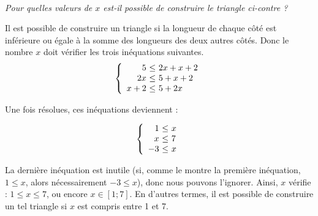 \documentclass[12pt]{article}
\begin{document}
\begin{exercice}~
  \begin{multicols}{2}
    \emph{Pour quelles valeurs de $x$ est-il possible de construire le triangle ci-contre ?}


\end{multicols}
Il est possible de construire un triangle si la longueur de chaque côté est inférieure ou égale à la somme des longueurs des deux autres côtés. Donc le nombre $x$ doit vérifier les trois inéquations suivantes.
\[\left\{\begin{array}{r@{\ \leq\ }l}
    5 & 2x+x+2\\
    2x & 5+x+2\\
    x+2 & 5+2x
\end{array}\right.\]

Une fois résolues, ces inéquations deviennent :

\[\left\{\begin{array}{r@{\ \leq\ }l}
    1 & x\\
    x & 7\\
    -3 & x
\end{array}\right.\]

La dernière inéquation est inutile (si, comme le montre la première inéquation, $1\leq x$, alors nécessairement $-3\leq x$), donc nous pouvons l'ignorer. Ainsi, $x$ vérifie : $1\leq x \leq7$, ou encore $x\in\left[ 1;7 \right]$. En d'autres termes, il est possible de construire un tel triangle si $x$ est compris entre 1 et 7.
\end{exercice}
\end{document}
